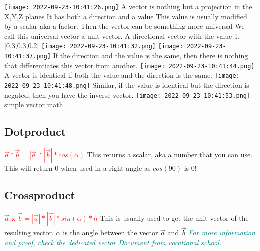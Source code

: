 \documentclass[main.tex,fontsize=8pt,paper=a4,paper=portrait,DIV=calc,]{scrartcl}
\begin{document}
\begin{multicols*}{2}
\texttt{[image: 2022-09-23-10:41:26.png]}
{A vector is nothing but a projection in the X,Y,Z planes \newline 
It has both a direction and a value \newline
This value is usually modified by a scalar aka a factor. Then the vector can be something more universal \newline
We call this universal vector a unit vector. A directional vector with the value 1.}[0.3,0.3,0.2]\newline
\texttt{[image: 2022-09-23-10:41:32.png]}
\texttt{[image: 2022-09-23-10:41:37.png]}\newline
If the direction and the value is the same, then there is nothing that differentiates this vector from another.\newline
\texttt{[image: 2022-09-23-10:41:44.png]}\newline
A vector is identical if both the value and the direction is the same.\newline
\texttt{[image: 2022-09-23-10:41:48.png]}\newline 
Similar, if the value is identical but the direction is negated, then you have the inverse vector.\newline
\texttt{[image: 2022-09-23-10:41:53.png]}\newline 
simple vector math \newline
\subsection{Dotproduct}
\Large{\textbf{\textcolor{red}{\( \vec{a} * \vec{b} = |\vec{a}| * |\vec{b}| * cos(\alpha) \)}}}\newline
\normalsize This returns a scalar, aka a number that you can use.\newline
This will return 0 when used in a right angle as \(cos(90)\) is 0!\\
\subsection{Crossproduct}
\Large{\textbf{\textcolor{red}{\( \vec{a} \text{ x } \vec{b} = |\vec{a}| * |\vec{b}| * sin(\alpha) * n \)}}}\newline
\normalsize This is usually used to get the unit vector of the resulting vector.\newline
\(\alpha\) is the angle between the vector \(\vec{a}\) and \(\vec{b}\)\newline
\emph{\textcolor{teal}{For more information and proof, check the dedicated vector Document from vocational school.}}\\


\end{multicols*}
\end{document}
